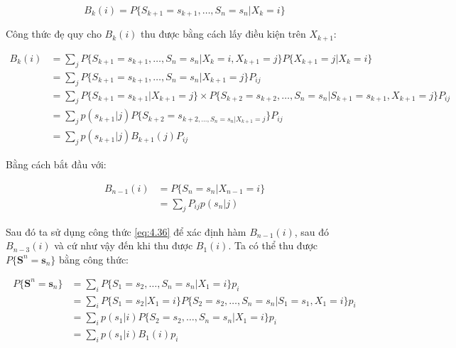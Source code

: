 \documentclass[14pt, a4paper]{article}
\numberwithin{equation}{section}
\numberwithin{figure}{section}
\theoremstyle{sltheorem}
\theoremstyle{soltheorem}
\numberwithin{dl}{section}
\numberwithin{md}{section}
\numberwithin{vd}{section}
\begin{document}
    \begin{equation*}
        B_k (i) = P \lbrace S_{k+1} = s_{k+1}, \dots, S_n = s_n \vert X_k = i \rbrace
    \end{equation*}

    Công thức đẹ quy cho $B_k(i)$ thu được bằng cách lấy điều kiện trên $X_{k+1}$:

    \begin{equation} \label{eq:4.36}
        \begin{aligned}
            B_k (i) &= \sum_j P \lbrace S_{k+1} = s_{k+1}, \dots, S_n = s_n \vert X_k = i, X_{k+1} = j \rbrace P \lbrace X_{k+1} = j \vert X_k = i \rbrace \\
            &= \sum_j P \lbrace S_{k+1} = s_{k+1}, \dots, S_n = s_n \vert X_{k+1} = j \rbrace P_{ij} \\
            &= \sum_j P \lbrace S_{k+1} = s_{k+1} \vert X_{k+1} = j \rbrace \times P \lbrace S_{k+2} = s_{k+2}, \dots, S_n = s_n \vert S_{k+1} = s_{k+1}, X_{k+1} = j \rbrace P_{ij} \\
            &= \sum_j p(s_{k+1} \vert j) P \lbrace S_{k+2} = s_{k+2, \dots, S_n = s_n \vert X_{k+1} = j} \rbrace P_{ij} \\
            &= \sum_j p(s_{k+1} \vert j) B_{k+1} (j) P_{ij}
        \end{aligned}
    \end{equation}

    Bằng cách bắt đầu với:

    \begin{equation*}
        \begin{aligned}
            B_{n-1} (i) &= P \lbrace S_n = s_n \vert X_{n-1} = i \rbrace \\
            &= \sum_j P_{ij} p (s_n \vert j)
        \end{aligned}
    \end{equation*}

    Sau đó ta sử dụng công thức \ref{eq:4.36} để xác định hàm $B_{n-1}(i)$, sau đó $B_{n-3}(i)$ và cứ như vậy đến khi thu được $B_1(i)$.
    Ta có thể thu được $P \lbrace \mathbf{S}^n = \mathbf{s}_n \rbrace$ bằng công thức:

    \begin{equation*}
        \begin{aligned}
            P \lbrace \mathbf{S}^n = \mathbf{s}_n \rbrace &= \sum_i P \lbrace S_1 = s_2, \dots, S_n = s_n \vert X_1 = i \rbrace p_i \\
            &= \sum_i P \lbrace S_1 = s_2 \vert X_1 = i \rbrace P \lbrace S_2 = s_2, \dots, S_n = s_n \vert S_1 = s_1, X_1 = i \rbrace p_i \\
            &= \sum_i p(s_1 \vert i) P \lbrace S_2 = s_2, \dots, S_n = s_n \vert X_1 = i \rbrace p_i \\
            &= \sum_i p(s_1 \vert i) B_1 (i) p_i
        \end{aligned}
    \end{equation*}
\end{document}
